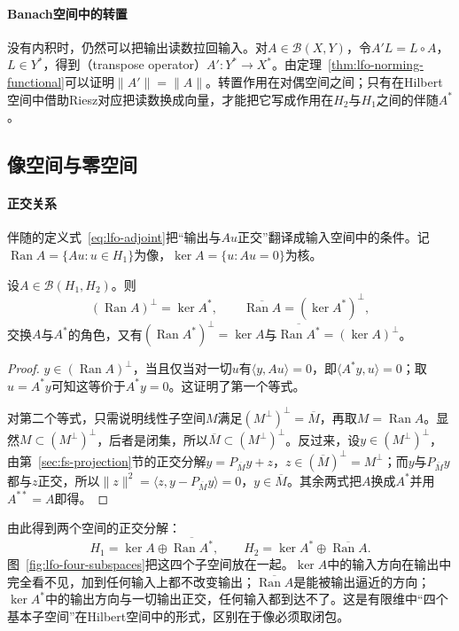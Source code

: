 \paragraph{Banach空间中的转置}
没有内积时，仍然可以把输出读数拉回输入。对$A\in\mathcal B(X,Y)$，令$A'L=L\circ A$，$L\in Y^*$，得到（transpose operator）$A':Y^*\to X^*$。由定理~\ref{thm:lfo-norming-functional}可以证明$\|A'\|=\|A\|$。转置作用在对偶空间之间；只有在Hilbert空间中借助Riesz对应把读数换成向量，才能把它写成作用在$H_2$与$H_1$之间的伴随$A^*$。

\subsection{像空间与零空间}
\label{sec:lfo-range-kernel}

\paragraph{正交关系}
伴随的定义式~\eqref{eq:lfo-adjoint}把“输出与$Au$正交”翻译成输入空间中的条件。记$\operatorname{Ran}A=\{Au:u\in H_1\}$为像，$\ker A=\{u:Au=0\}$为核。

\begin{theorem}[像与核的正交关系]
\label{thm:lfo-range-kernel}
设$A\in\mathcal B(H_1,H_2)$。则
\begin{equation}
 (\operatorname{Ran}A)^\perp=\ker A^*,\qquad\overline{\operatorname{Ran}A}=(\ker A^*)^\perp ,
 \label{eq:lfo-range-kernel}
\end{equation}
交换$A$与$A^*$的角色，又有$(\operatorname{Ran}A^*)^\perp=\ker A$与$\overline{\operatorname{Ran}A^*}=(\ker A)^\perp$。
\end{theorem}

\begin{proof}
$y\in(\operatorname{Ran}A)^\perp$，当且仅当对一切$u$有$\langle y,Au\rangle=0$，即$\langle A^*y,u\rangle=0$；取$u=A^*y$可知这等价于$A^*y=0$。这证明了第一个等式。

对第二个等式，只需说明线性子空间$M$满足$(M^\perp)^\perp=\overline M$，再取$M=\operatorname{Ran}A$。显然$M\subset(M^\perp)^\perp$，后者是闭集，所以$\overline M\subset(M^\perp)^\perp$。反过来，设$y\in(M^\perp)^\perp$，由第~\ref{sec:fs-projection}节的正交分解$y=P_{\overline M}y+z$，$z\in(\overline M)^\perp=M^\perp$；而$y$与$P_{\overline M}y$都与$z$正交，所以$\|z\|^2=\langle z,y-P_{\overline M}y\rangle=0$，$y\in\overline M$。其余两式把$A$换成$A^*$并用$A^{**}=A$即得。
\end{proof}

由此得到两个空间的正交分解：
\[
 H_1=\ker A\oplus\overline{\operatorname{Ran}A^*},\qquad H_2=\ker A^*\oplus\overline{\operatorname{Ran}A} .
\]
图~\ref{fig:lfo-four-subspaces}把这四个子空间放在一起。$\ker A$中的输入方向在输出中完全看不见，加到任何输入上都不改变输出；$\overline{\operatorname{Ran}A}$是能被输出逼近的方向；$\ker A^*$中的输出方向与一切输出正交，任何输入都到达不了。这是有限维中“四个基本子空间”在Hilbert空间中的形式，区别在于像必须取闭包。

